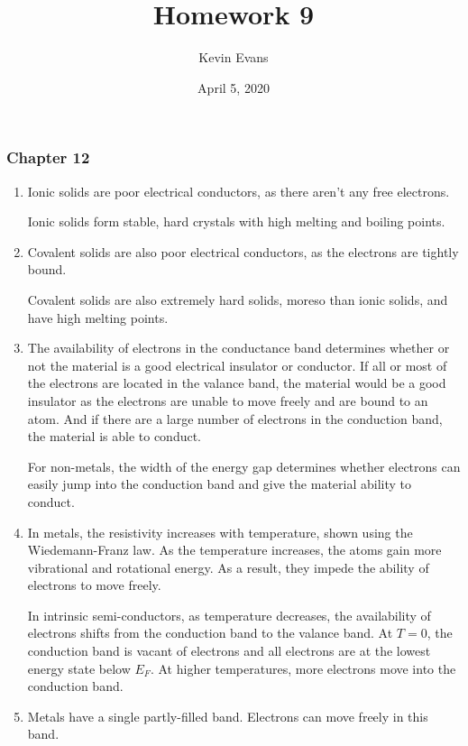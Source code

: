 \documentclass{homework}
\title{Homework 9}
\author{Kevin Evans}
\date{April 5, 2020}
\begin{document}
	\maketitle
	\subsubsection*{Chapter 12}
	\begin{enumerate}[label={\arabic*.}]%
		\item Ionic solids are poor electrical conductors, as there aren't any free electrons.
		
			Ionic solids form stable, hard crystals with high melting and boiling points.
		\item Covalent solids are also poor electrical conductors, as the electrons are tightly bound.
		
		Covalent solids are also extremely hard solids, moreso than ionic solids, and have high melting points.
		
		\item The availability of electrons in the conductance band determines whether or not the material is a good electrical insulator or conductor. If all or most of the electrons are located in the valance band, the material would be a good insulator as the electrons are unable to move freely and are bound to an atom. And if there are a large number of electrons in the conduction band, the material is able to conduct.
		
		For non-metals, the width of the energy gap determines whether electrons can easily jump into the conduction band and give the material ability to conduct.
		
		\item In metals, the resistivity increases with temperature, shown using the Wiedemann-Franz law. As the temperature increases, the atoms gain more vibrational and rotational energy. As a result, they impede the ability of electrons to move freely. 
		
		In intrinsic semi-conductors, as temperature decreases, the availability of electrons shifts from the conduction band to the valance band. At $T=0$, the conduction band is vacant of electrons and all electrons are at the lowest energy state below $E_F$. At higher temperatures, more electrons move into the conduction band.
		
		\item Metals have a single partly-filled band. Electrons can move freely in this band.
		

\end{enumerate}
\end{document}
